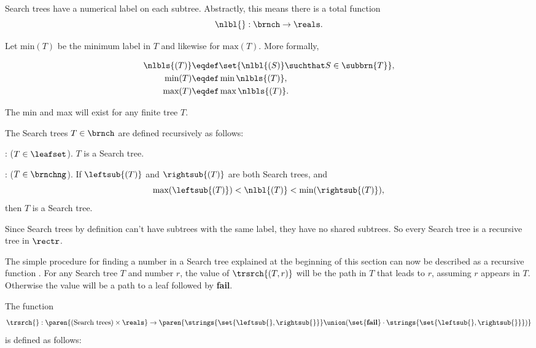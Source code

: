 \begin{definition}
Search trees have a numerical label on each subtree.  Abstractly, this
means there is a total function
\[
\nlbl{}:\brnch \to \reals.
\]

Let $\text{min}(T)$ be the minimum label in $T$ and likewise for
$\text{max}(T)$.  More formally,
\begin{definition}
\begin{align}
\nlbls{(T)} & \eqdef \set{\nlbl{(S)} \suchthat S \in \subbrn{T}},\\
\text{min}(T) &\eqdef \min \nlbls{(T)}, \label{defminT}\\
\text{max}(T) &\eqdef \max \nlbls{(T)}.\label{defmaxT}
\end{align}
\end{definition}
The min and max will exist for any finite tree $T$.

\begin{definition}\label{defsearchtree}
The Search trees $T \in \brnch$ are defined recursively as follows:

: ($T \in \leafset$).  $T$ is a Search tree.

: ($T \in \brnchng$).
If $\leftsub{(T)}$ and $\rightsub{(T)}$ are both Search trees, and
\[
\text{max}(\leftsub{(T)}) < \nlbl{(T)} < \text{min}(\rightsub{(T)}),
\]
then $T$ is a Search tree.
\end{definition}

Since Search trees by definition can't have subtrees with the same
label, they have no shared subtrees.  So every Search tree is a
recursive tree in $\rectr$.

\iffalse
\begin{definition}\label{defsearchtree}
A recursive tree $T \in \rectr$ is a \term{Search tree} when
\begin{equation}\label{}
\text{max}(\leftsub{(S)}) < \nlbl{(S)} < \text{min}(\rightsub{(S)}).
\end{equation}
for every nonleaf $S \in \subbrn{T}$.
\end{definition}
\fi

The simple procedure for finding a number in a Search tree explained
at the beginning of this section can now be described as a recursive
function \trsrch{}.  For any Search tree $T$ and number $r$, the value
of $\trsrch{(T,r)}$ will be the path in $T$ that leads to $r$,
assuming $r$ appears in $T$.  Otherwise the value will be a path to a
leaf followed by \textbf{fail}.

\begin{definition}
The function
\[
\trsrch{}: \paren{\text{(Search trees)} \times \reals} \to
\paren{\strings{\set{\leftsub{},\rightsub{}}} \union
      (\set{\textbf{fail}}\cdot\strings{\set{\leftsub{},\rightsub{}}})}
\]
is defined as follows:


\end{definition}
\end{definition}
